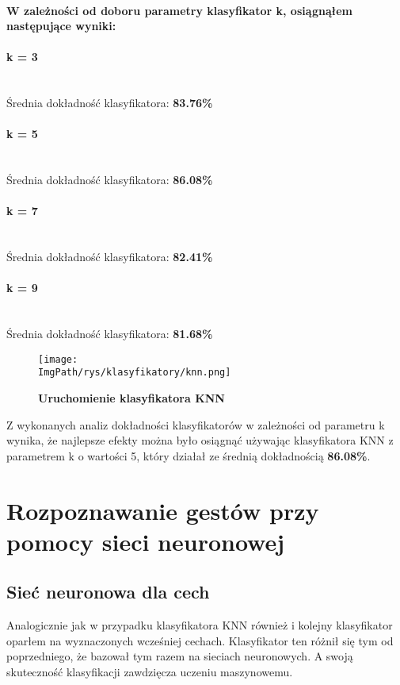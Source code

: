 \documentclass[a4paper,12pt,twoside,openany]{report}
\newcommand{\ImgPath}{.}
\begin{document}
\paragraph{W zależności od doboru parametry klasyfikator k, osiągnąłem następujące wyniki:}
{\centering
\paragraph{k = 3}
	\mbox{}\\
	Średnia dokładność klasyfikatora: \textbf{83.76\%}
\paragraph{k = 5}
	\mbox{}\\
	Średnia dokładność klasyfikatora: \textbf{86.08\%}
\paragraph{k = 7}
	\mbox{}\\
	Średnia dokładność klasyfikatora: \textbf{82.41\%}
\paragraph{k = 9}
	\mbox{}\\
	Średnia dokładność klasyfikatora: \textbf{81.68\%} \par
}
	\begin{figure}[H]
		\centering
		{\label{fig:b}\texttt{[image: \\ImgPath/rys/klasyfikatory/knn.png]}}
		\caption{  \textbf{Uruchomienie klasyfikatora KNN}}
	\end{figure}
	
Z wykonanych analiz dokładności klasyfikatorów w zależności od parametru k wynika, że najlepsze efekty można było osiągnąć używając klasyfikatora KNN z parametrem k o wartości 5, który działał ze średnią dokładnością \textbf{86.08\%}.
\section{Rozpoznawanie gestów przy pomocy sieci neuronowej}
\subsection{Sieć neuronowa dla cech}
	Analogicznie jak w przypadku klasyfikatora KNN również i  kolejny klasyfikator oparłem na wyznaczonych wcześniej cechach. Klasyfikator ten różnił się tym od poprzedniego, że bazował tym razem na sieciach neuronowych. A swoją skuteczność klasyfikacji zawdzięcza uczeniu maszynowemu.
	
\end{document}
